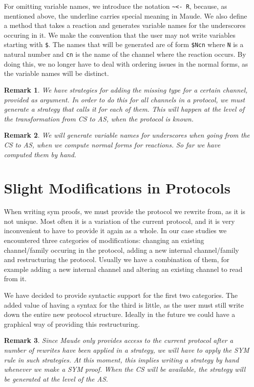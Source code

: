 \documentclass{article}
\newtheorem{remark}{Remark}
\begin{document}
For omitting variable names, we introduce the notation \verb+~<- R+,
because, as mentioned above, the underline carries special meaning in Maude. We also define a method that takes a reaction and generates variable names for the underscores occuring in it. We make the convention that the user may not write variables starting with \verb+$+. The names that will be generated are of form \verb+$Ncn+ where \verb+N+ is a natural number and 
\verb+cn+ is the name of the channel where the reaction occurs. By doing this, we no longer have to deal with ordering issues in the normal forms, as the variable names will be distinct. 

\begin{remark}
We have strategies for adding the missing type for a certain channel, 
provided as argument. In order to do this for all channels in a protocol,
we must generate a strategy that calls it for each of them. This will
happen at the level of the transformation from CS to AS, when the protocol
is known.
\end{remark}

\begin{remark} 
We will generate variable names for underscores when going from the CS to AS, when we compute normal forms for reactions. So far we have computed them by hand.
\end{remark}

\section{Slight Modifications in Protocols}

When writing sym proofs, we must provide the protocol we rewrite from, as it is not unique. Most often it is a variation of the current protocol, and 
it is very inconvenient to have to provide it again as a whole. In our case studies we encountered three categories of modifications: changing an existing channel/family occuring in the protocol, adding a new internal
channel/family and restructuring the protocol. Usually we have a combination of them, for example adding a new internal channel and altering an existing channel to read from it. 

We have decided to provide syntactic support for the first two categories. 
The added value of having a syntax for the third is little, as the user must still write down the entire new protocol structure. Ideally in the 
future we could have a graphical way of providing this restructuring.

\begin{remark}
Since Maude only provides access to the current protocol after a number
of rewrites have been applied in a strategy, we will have to apply the SYM rule in such strategies. At this moment, this implies writing a strategy
by hand whenever we make a SYM proof. When the CS will be available,
the strategy will be generated at the level of the AS.
\end{remark}
\end{document}
